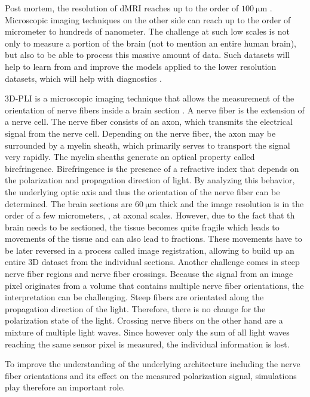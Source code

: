 Post mortem, the resolution of \ac{dMRI} reaches up to the order of $\SI{100}{\micro\meter}$ \cite{beaujoin:hal-02876136}.
Microscopic imaging techniques on the other side can reach up to the order of micrometer to hundreds of nanometer.
The challenge at such low scales is not only to measure a portion of the brain (not to mention an entire human brain), but also to be able to process this massive amount of data.
Such datasets will help to learn from and improve the models applied to the lower resolution datasets, which will help with \eg{} diagnostics \cite{Yendiki2021}.
\par
% 
\ac{3D-PLI} is a microscopic imaging technique that allows the measurement of the orientation of nerve fibers inside a brain section \cite{Axer2011a, Axer2011, Axer2016}.
A nerve fiber is the extension of a nerve cell.
The nerve fiber consists of an axon, which transmits the electrical signal from the nerve cell.
Depending on the nerve fiber, the axon may be surrounded by a myelin sheath, which primarily serves to transport the signal very rapidly.
The myelin sheaths generate an optical property called birefringence.
Birefringence is the presence of a refractive index that depends on the polarization and propagation direction of light.
By analyzing this behavior, the underlying optic axis and thus the orientation of the nerve fiber can be determined.
The brain sections are $\SI{60}{\micro\meter}$ thick and the image resolution is in the order of a few micrometers, \ie{}, at axonal scales.
However, due to the fact that th brain needs to be sectioned, the tissue becomes quite fragile which leads to movements of the tissue and can also lead to fractions.
These movements have to be later reversed in a process called image registration, allowing to build up an entire 3D dataset from the individual sections.
Another challenge comes in steep nerve fiber regions and nerve fiber crossings.
Because the signal from an image pixel originates from a volume that contains multiple nerve fiber orientations, the interpretation can be challenging.
Steep fibers are \eg{} orientated along the propagation direction of the light.
Therefore, there is no change for the polarization state of the light.
Crossing nerve fibers on the other hand are a mixture of multiple light waves.
Since however only the sum of all light waves reaching the same sensor pixel is measured, the individual information is lost.
\par
% 
To improve the understanding of the underlying architecture including the nerve fiber orientations and its effect on the measured polarization signal, simulations play therefore an important role.
